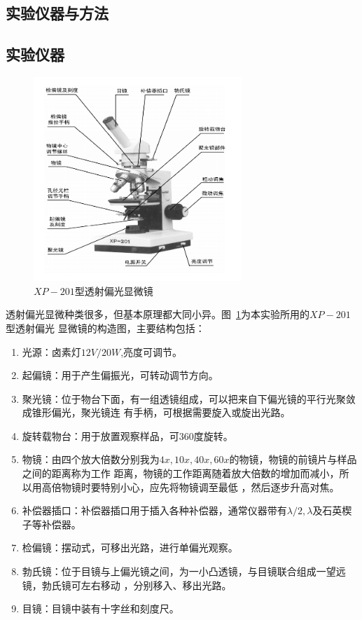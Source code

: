 \documentclass[11pt,a4paper]{article}
\begin{document}
\begin{spacing}{1.3}
\begin{CJK*}{UTF8}{gbsn}
\section{实验仪器与方法}
\subsection{实验仪器}
\begin{figure}[h!]
\centering
\includegraphics[width=0.7\textwidth]{fig4-1-16}
\caption{$XP-201$型透射偏光显微镜}
\label{fig:4-1-16}
\end{figure}
透射偏光显微种类很多，但基本原理都大同小异。图~\ref{fig:4-1-16}为本实验所用的$XP-201$型透射偏光
显微镜的构造图，主要结构包括：
\begin{enumerate}
\item 光源：卤素灯$12V/20W$,亮度可调节。
\item 起偏镜：用于产生偏振光，可转动调节方向。
\item 聚光镜：位于物台下面，有一组透镜组成，可以把来自下偏光镜的平行光聚敛成锥形偏光，聚光镜连
有手柄，可根据需要旋入或旋出光路。
\item 旋转载物台：用于放置观察样品，可$360$度旋转。
\item 物镜：由四个放大倍数分别我为$4x,10x,40x,60x$的物镜，物镜的前镜片与样品之间的距离称为工作
距离，物镜的工作距离随着放大倍数的增加而减小，所以用高倍物镜时要特别小心，应先将物镜调至最低
，然后逐步升高对焦。
\item 补偿器插口：补偿器插口用于插入各种补偿器，通常仪器带有$\lambda/2,\lambda$及石英楔子等补偿器。
\item 检偏镜：摆动式，可移出光路，进行单偏光观察。
\item 勃氏镜：位于目镜与上偏光镜之间，为一小凸透镜，与目镜联合组成一望远镜，勃氏镜可左右移动
，分别移入、移出光路。
\item 目镜：目镜中装有十字丝和刻度尺。
\end{enumerate}


\end{CJK*}
\end{spacing}
\end{document}
